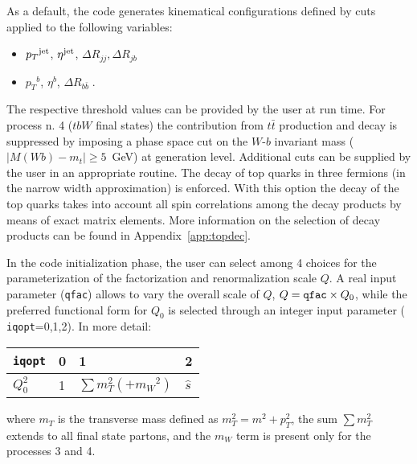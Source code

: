 \documentclass[paper]{JHEP3}
\def    \bbar   {\bar{b}}
\def    \tbar   {\bar{t}}
\def    \mW             {\mbox{$m_W$} }
\def    \pt             {\mbox{$p_T$}}
\def    \ptsq           {\mbox{$p^2_T$}}
\def    \mT             {\mbox{$m_T$}}
\def    \mTsq           {\mbox{$m^2_T$}}
\begin{document}
As a default, the code generates kinematical configurations defined by
cuts applied to the following variables:
\begin{itemize}
\item $\pt^{\rm jet}$, $\eta^{\rm jet}$, $\Delta R_{jj},\Delta R_{jb}$
\item $\pt^{ b}$, $\eta^{ b}$, $\Delta R_{b\bbar} \; .$
\end{itemize}
The respective threshold values can be provided by the user at run
time. For process n. 4 ($t b W$ final states) the contribution from 
$t \tbar$ production and decay is suppressed by imposing a phase space cut 
on the $W$-$b$ invariant mass ($\vert M(Wb) - m_t| \geq 5$~GeV) 
at generation level.
Additional cuts can be supplied by the user in an appropriate
routine. 
The decay of top quarks in three fermions 
(in the narrow width approximation) is enforced.
With this option the decay of the top quarks takes into account 
all spin correlations among the decay products by means of exact 
matrix elements. More information on the selection of decay products can 
be found in Appendix~\ref{app:topdec}.

In the code initialization phase, the user can select 
among 4 choices for the parameterization of the 
factorization and renormalization scale $Q$. A real input
parameter ({\tt qfac}) allows to vary the overall scale of $Q$,
$Q={\tt qfac}\times Q_0$, while the preferred functional form for
$Q_0$ is selected through an integer input parameter ({\tt
iqopt}=0,1,2).  In more detail:
{\renewcommand{\arraystretch}{1.2}
\begin{center}
\begin{tabular}{l||l|l|l}
{\tt iqopt} & 0 & 1 & 2\\  \hline
$Q_0^2$ & 1 & $\sum \mTsq (+ \mW^2)$ & $\hat {s} $ \\
\end{tabular}
\end{center}}
where $\mT$ is the transverse mass defined as $\mTsq=m^2+\ptsq$,
the sum $\sum \mTsq $ extends to all final
state partons, and the $\mW$ term is present only for the processes 3
and 4.
\end{document}
